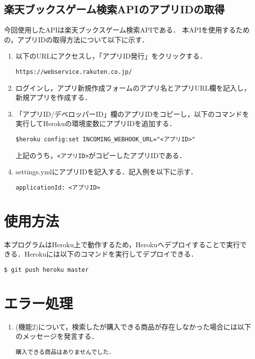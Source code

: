 \documentclass[12pt]{jsarticle}
\begin{document}
\subsection{楽天ブックスゲーム検索APIのアプリIDの取得}
今回使用したAPIは楽天ブックスゲーム検索APIである．
本APIを使用するための，アプリIDの取得方法について以下に示す．
\begin{enumerate}
  \item 以下のURLにアクセスし，「アプリID発行」をクリックする．
{
\fontsize{9pt}{10pt}\selectfont
\begin{verbatim}
https://webservice.rakuten.co.jp/
\end{verbatim}
}
  \item ログインし，アプリ新規作成フォームのアプリ名とアプリURL欄を記入し，新規アプリを作成する．

  \item 「アプリID/デベロッパーID」欄のアプリIDをコピーし，以下のコマンドを実行してHerokuの環境変数にアプリIDを追加する．

{
\fontsize{9pt}{10pt}\selectfont
\begin{verbatim}
$heroku config:set INCOMING_WEBHOOK_URL="<アプリID>"
\end{verbatim}
}
上記のうち，\verb|<アプリID>|がコピーしたアプリIDである．

\item settings.ymlにアプリIDを記入する．記入例を以下に示す．

{
\fontsize{9pt}{10pt}\selectfont
\begin{verbatim}
applicationId: <アプリID>
\end{verbatim}
}
\end{enumerate}

\section{使用方法}
本プログラムはHeroku上で動作するため，Herokuへデプロイすることで実行できる．Herokuには以下のコマンドを実行してデプロイできる．

{
\fontsize{9pt}{10pt}\selectfont
\begin{verbatim}
$ git push heroku master
\end{verbatim}
}
\section{エラー処理}
\begin{enumerate}
  \item(機能2)について，検索したが購入できる商品が存在しなかった場合には以下のメッセージを発言する．

{
\fontsize{9pt}{10pt}\selectfont
\begin{verbatim}
購入できる商品はありませんでした．
\end{verbatim}
}
\end{enumerate}
\end{document}
